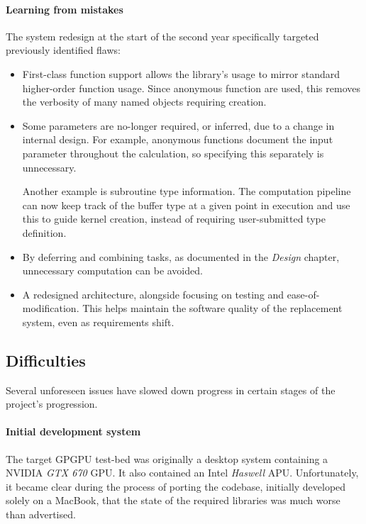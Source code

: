 \paragraph*{Learning from mistakes}
The system redesign at the start of the second year specifically targeted previously identified flaws:
\begin{itemize}
    \item First-class function support allows the library's usage to mirror standard higher-order function usage. Since anonymous function are used, this removes the verbosity of many named objects requiring creation.

    \item Some parameters are no-longer required, or inferred, due to a change in internal design. For example, anonymous functions document the input parameter throughout the calculation, so specifying this separately is unnecessary.

      Another example is subroutine type information. The computation pipeline can now keep track of the buffer type at a given point in execution and use this to guide kernel creation, instead of requiring user-submitted type definition.

    \item By deferring and combining tasks, as documented in the \emph{Design} chapter, unnecessary computation can be avoided.

    \item A redesigned architecture, alongside focusing on testing and ease-of-modification. This helps maintain the software quality of the replacement system, even as requirements shift.
\end{itemize}

\subsection{Difficulties}
Several unforeseen issues have slowed down progress in certain stages of the project's progression.

\paragraph*{Initial development system}
The target \ac{GPGPU} test-bed was originally a desktop system containing a NVIDIA \emph{GTX 670} \ac{GPU}. It also contained an Intel \emph{Haswell} \ac{APU}. Unfortunately, it became clear during the process of porting the codebase, initially developed solely on a MacBook, that the state of the required libraries was much worse than advertised.

